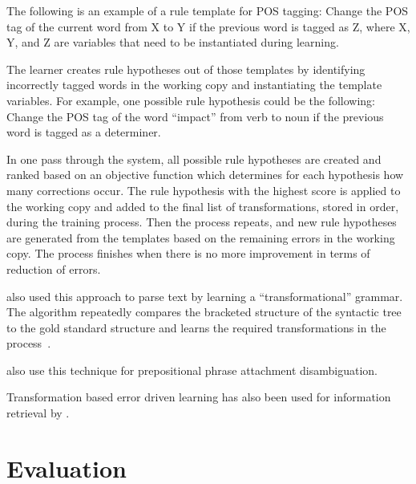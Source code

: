 The following is an example of a rule template for POS tagging: Change the POS tag of the current word from X to Y if the previous word is tagged as Z, where X, Y, and Z are variables that need to be instantiated during learning. 

The learner creates rule hypotheses out of those templates by identifying incorrectly tagged words in the working copy and instantiating the template variables.
For example, one possible rule hypothesis could be the following: Change the POS tag of the word ``impact'' from verb to noun if the previous word is tagged as a determiner. %

In one pass through the system, all possible rule hypotheses are created and ranked  based on an objective function which determines for each hypothesis how many corrections occur. The rule hypothesis with the highest score is applied to the working copy and added to the final list of transformations, stored in order, during the training process. Then the process repeats, and new rule hypotheses are generated from the templates based on the remaining errors in the working copy. The process finishes when there is no more improvement in terms of reduction of errors.~ 

\citet{brill1993automatic} also used this approach to parse text by learning a ``transformational'' grammar. The algorithm repeatedly compares the bracketed structure of the syntactic tree to the gold standard structure and learns the required transformations in the process~. 

\citet{brill1994rule} also use this technique for prepositional phrase attachment disambiguation. 

Transformation based error driven learning has also been used for information retrieval by \citet{woodley2005applying}.






\section{Evaluation}

